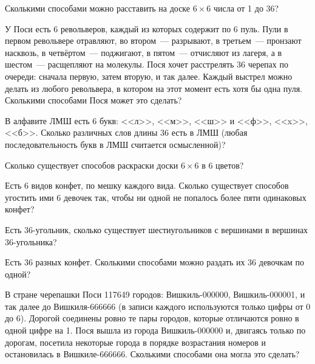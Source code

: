\begin{problems}
\item Сколькими способами можно расставить на доске $6\times6$ числа от 1 до 36? %

\item У Поси есть 6 револьверов, каждый из которых содержит по 6 пуль. Пули в первом револьвере отравляют, во втором~--- разрывают, в третьем~--- пронзают насквозь, в четвёртом~--- поджигают, в пятом~--- отчисляют из лагеря, а в шестом~--- расщепляют на молекулы. Пося хочет расстрелять 36 черепах по очереди: сначала первую, затем вторую, и так далее. Каждый выстрел можно делать из любого револьвера, в котором на этот момент есть хотя бы одна пуля. Сколькими способами Пося может это сделать? %

\item В алфавите ЛМШ есть 6 букв: <<л>>, <<м>>, <<ш>> и <<ф>>, <<x>>, <<б>>. Сколько различных слов длины 36 есть в ЛМШ (любая последовательность букв в ЛМШ считается осмысленной)? %

\item Сколько существует способов раскраски доски $6\times6$ в 6 цветов? %

\item Есть 6 видов конфет, по мешку каждого вида. Сколько существует способов угостить ими 6 девочек так, чтобы ни одной не попалось более пяти одинаковых конфет? %

\item Есть 36-угольник, сколько существует шестиугольников с вершинами в вершинах 36-угольника? %

\item Есть 36 разных конфет. Сколькими способами можно раздать их 36 девочкам по одной? %

\item В стране черепашки Поси 117649 городов: Вишкиль-000000, Вишкиль-000001, и так далее до Вишкиля-666666 (в записи каждого используются только цифры от 0 до 6). Дорогой соединены ровно те пары городов, которые отличаются ровно в одной цифре на 1. Пося вышла из города Вишкиль-000000 и, двигаясь только по дорогам, посетила некоторые города в порядке возрастания номеров и остановилась в Вишкиле-666666. Сколькими способами она могла это сделать? %


\end{problems}
